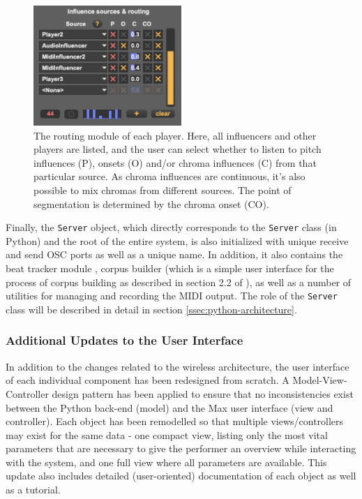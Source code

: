  \begin{figure}[h!]
    \centering        
 	\includegraphics[width=0.50\textwidth, keepaspectratio]{figures/routing-ui.png}
    \caption{The routing module of each player. Here, all influencers and other players are listed, and the user can select whether to listen to pitch influences (P), onsets (O) and/or chroma influences (C) from that particular source. As chroma influences are continuous, it's also possible to mix chromas from different sources. The point of segmentation is determined by the chroma onset (CO).}
    \label{fig:routing-ui}
\end{figure}

Finally, the \texttt{Server} object, which directly corresponds to the \texttt{Server} class (in Python) and the root of the entire system, is also initialized with unique receive and send OSC ports as well as a unique name. In addition, it also contains the beat tracker module \cite{bonnasse2010donner}, corpus builder (which is a simple user interface for the process of corpus building as described in section 2.2 of \cite{borg2020dynamic}), as well as a number of utilities for managing and recording the MIDI output. The role of the \texttt{Server} class will be described in detail in section \ref{ssec:python-architecture}.

\subsubsection{Additional Updates to the User Interface}
In addition to the changes related to the wireless architecture, the user interface of each individual component has been redesigned from  scratch. A Model-View-Controller design pattern has been applied to ensure that no inconsistencies exist between the Python back-end (model) and the Max user interface (view and controller). Each object has been remodelled so that multiple views/controllers may exist for the same data - one compact view, listing only the most vital parameters that are necessary to give the performer an overview while interacting with the system, and one full view where all parameters are available. This update also includes detailed (user-oriented) documentation of each object as well as a tutorial.


